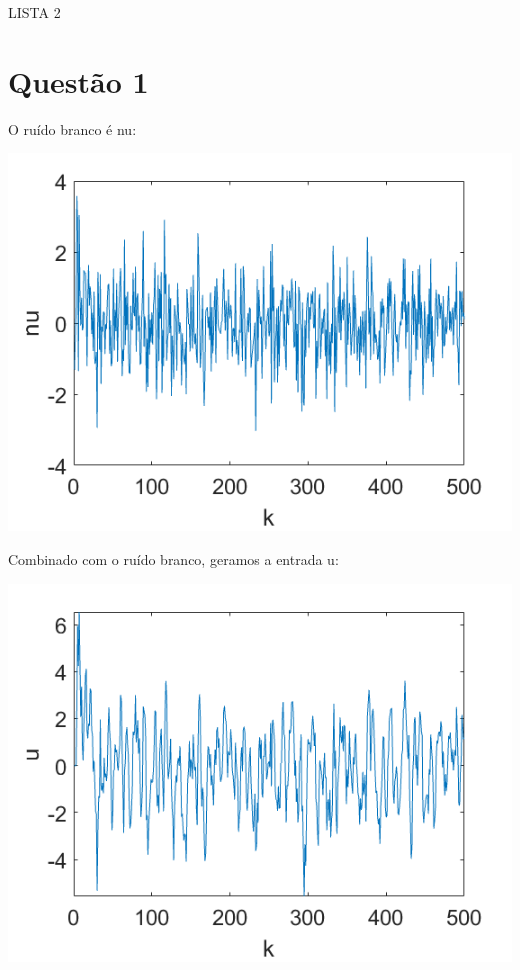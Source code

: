 \documentclass{rbfin}
\begin{document}
\rbfe{}


\large

\begin{center}
LISTA 2
\end{center}

\normalsize

\doublespacing

\section*{Questão 1}

O ruído branco é nu:

\begin{center}
\includegraphics[scale=0.666]{1nu}
\end{center}

Combinado com o ruído branco, geramos a entrada u:

\begin{center}
\includegraphics[scale=0.666]{1u}
\end{center}
\end{document}
